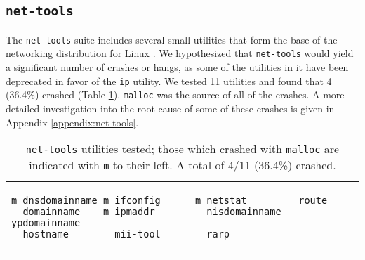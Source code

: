 \subsection{\texttt{net-tools}}
The \texttt{net-tools} suite includes several small utilities that form the base of the networking distribution for Linux \cite{nettools}. We hypothesized that \texttt{net-tools} would yield a significant number of crashes or hangs, as some of the utilities in it have been deprecated in favor of the \texttt{ip} utility. We tested 11 utilities and found that 4 (36.4\%) crashed (Table \ref{lst:net-tools}). \texttt{malloc} was the source of all of the crashes. A more detailed investigation into the root cause of some of these crashes is given in Appendix \ref{appendix:net-tools}.

\begin{table}[h]
\begin{tabular}{l}
\begin{lstlisting}
m dnsdomainname m ifconfig      m netstat         route
  domainname    m ipmaddr         nisdomainname   ypdomainname
  hostname        mii-tool        rarp
\end{lstlisting}
\end{tabular}
\caption{\texttt{net-tools} utilities tested; those which crashed with \texttt{malloc} are indicated with \texttt{m} to their left. A total of 4/11 (36.4\%) crashed.}
\label{lst:net-tools}
\end{table}